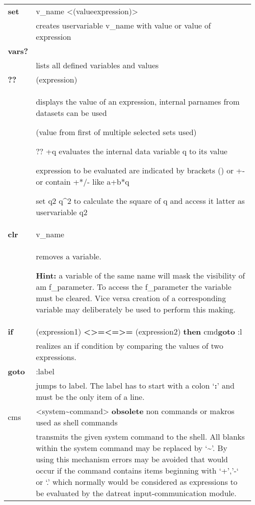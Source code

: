 \documentclass[]{article}
\begin{document}
\begin{longtable}[]{@{}ll@{}}
\toprule
\endhead
\textbf{set} & v\_name
\textless{}(value\textbar{}expression)\textgreater{}\tabularnewline
& creates uservariable v\_name with value or value of
expression\tabularnewline
\textbf{vars?} &\tabularnewline
& lists all defined variables and values\tabularnewline
\textbf{??} & (expression)\tabularnewline
\begin{minipage}[t]{0.47\columnwidth}\raggedright
\strut
\end{minipage} & \begin{minipage}[t]{0.47\columnwidth}\raggedright
displays the value of an expression, internal parnames from datasets can
be used

(value from first of multiple selected sets used)

?? +q evaluates the internal data variable q to its value

expression to be evaluated are indicated by brackets () or +- or contain
+*/- like a+b*q

set q2 q\^{}2 to calculate the square of q and access it latter as
uservariable q2\strut
\end{minipage}\tabularnewline
\textbf{clr} & v\_name\tabularnewline
\begin{minipage}[t]{0.47\columnwidth}\raggedright
\strut
\end{minipage} & \begin{minipage}[t]{0.47\columnwidth}\raggedright
removes a variable.

\textbf{Hint:} a variable of the same name will mask the visibility of
am f\_parameter. To access the f\_parameter the variable must be
cleared. Vice versa creation of a corresponding variable may
deliberately be used to perform this making.\strut
\end{minipage}\tabularnewline
\textbf{if} & (expression1)
\textbf{\textless{}}\textbar{}\textbf{\textgreater{}}\textbar{}\textbf{=}\textbar{}\textbf{\textless{}=}\textbar{}\textbf{\textgreater{}=}
(expression2) \textbf{then} cmd\textbar{}\textbf{goto} :l\tabularnewline
& realizes an if condition by comparing the values of two
expressions.\tabularnewline
\textbf{goto} & :label\tabularnewline
& jumps to label. The label has to start with a colon `\textbf{:}' and
must be the only item of a line.\tabularnewline
cms & \textless{}system\textasciitilde{}command\textgreater{}
\textbf{obsolete} non commands or makros used as shell
commands\tabularnewline
& transmits the given system command to the shell. All blanks within the
system command may be replaced by `\textbf{\textasciitilde{}}'. By using
this mechanism errors may be avoided that would occur if the command
contains items beginning with `+','-` or `.' which normally would be
considered as expressions to be evaluated by the datreat
input-communication module.\tabularnewline
\bottomrule
\end{longtable}
\end{document}
